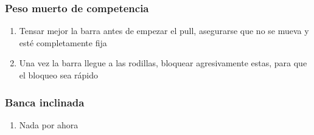 \documentclass[11pt]{article}
\begin{document}
\subsubsection{Peso muerto de competencia}
\label{sec:orgd446185}
\begin{enumerate}
\item Tensar mejor la barra antes de empezar el pull, asegurarse que no
se mueva y esté completamente fija
\item Una vez la barra llegue a las rodillas, bloquear agresivamente
estas, para que el bloqueo sea rápido
\end{enumerate}
\subsubsection{Banca inclinada}
\label{sec:orgc17db83}
\begin{enumerate}
\item Nada por ahora
\end{enumerate}
\end{document}
